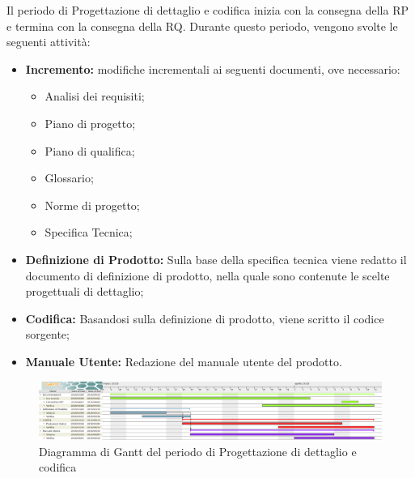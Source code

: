 Il periodo di Progettazione di dettaglio e codifica inizia con la consegna della RP e termina con la consegna della RQ.\newline
Durante questo periodo, vengono svolte le seguenti attività:
\begin{itemize}
	\item \textbf{Incremento: }modifiche incrementali ai seguenti documenti, ove necessario:
	\begin{itemize}
		\item Analisi dei requisiti;
		\item Piano di progetto;
		\item Piano di qualifica;
		\item Glossario;
		\item Norme di progetto;
		\item Specifica Tecnica;
	\end{itemize}
	\item \textbf{Definizione di Prodotto: }Sulla base della specifica tecnica viene redatto il documento di definizione di prodotto, nella quale sono contenute le scelte progettuali di dettaglio;
	\item \textbf{Codifica: }Basandosi sulla definizione di prodotto, viene scritto il codice sorgente;
	\item \textbf{Manuale Utente: }Redazione del manuale utente del prodotto. 
\end{itemize}


\begin{figure}[H]
	\includegraphics[width=1\linewidth]{Pianificazione/Progettazione_Dettaglio_Codififca.png}
	\caption{Diagramma di Gantt del periodo di Progettazione di dettaglio e codifica}
\end{figure}